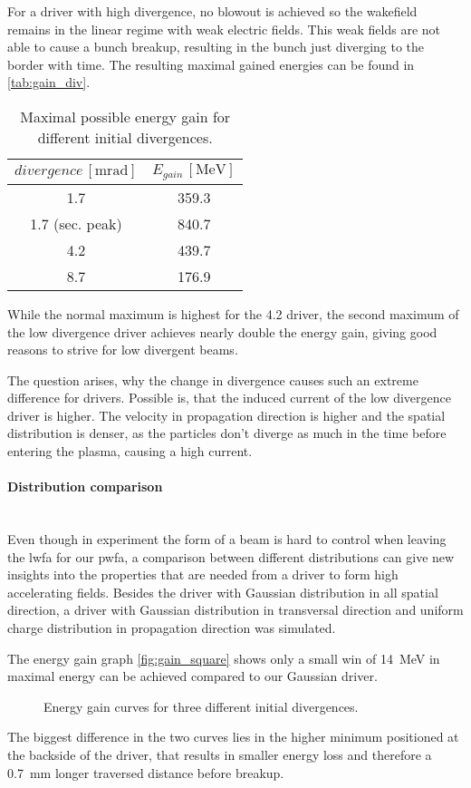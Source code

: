 \documentclass[bachelor_thesis]{subfiles}
\begin{document}
For a driver with high divergence, no blowout is achieved so the wakefield remains in the linear regime with weak electric fields. This weak fields are not able to cause a bunch breakup, resulting in the bunch just diverging to the border with time.
The resulting maximal gained energies can be found in \autoref{tab:gain_div}.
\begin{table}[h]
\begin{center}
\begin{tabular}{|c|c|} 
	\hline
 	$divergence \, \mathrm{[mrad]}$ & $E_{gain} \, \mathrm{[MeV]}$ \\ 
 	\hline
	1.7 & 359.3 \\ 
	1.7 (sec. peak) & 840.7 \\ 
 	4.2 & 439.7 \\
	8.7 & 176.9 \\
	\hline
\end{tabular}
\caption{Maximal possible energy gain for different initial divergences.}\label{tab:gain_div}
\end{center}
\end{table}
While the normal maximum is highest for the \qty{4.2}{\mrad} driver, the second maximum of the low divergence driver achieves nearly double the energy gain, giving good reasons to strive for low divergent beams.
 
The question arises, why the change in divergence causes such an extreme difference for drivers. Possible is, that the induced current of the low divergence driver is higher. The velocity in propagation direction is higher and the spatial distribution
is denser, as the particles don't diverge as much in the time before entering the plasma, causing a high current. 


\paragraph*{Distribution comparison}\hspace{0pt} \\
Even though in experiment the form of a beam is hard to control when leaving the \gls{lwfa} for our \gls{pwfa}, a comparison between different distributions can give new insights into the properties that are needed from a driver
to form high accelerating fields. Besides the driver with Gaussian distribution in all spatial direction, a driver with Gaussian distribution in transversal direction and uniform charge distribution in propagation direction 
was simulated.

The energy gain graph \autoref{fig:gain_square} shows only a small win of \qty{14}{\MeV} in maximal energy can be achieved compared to our Gaussian driver.
\begin{figure}
	\centering
	
	\caption{Energy gain curves for three different initial divergences.}
	\label{fig:gain_square}
\end{figure}
The biggest difference in the two curves lies in the higher minimum positioned at the backside of the driver, that results in smaller energy loss and therefore a \qty{0.7}{mm} longer traversed distance before breakup.
\end{document}
